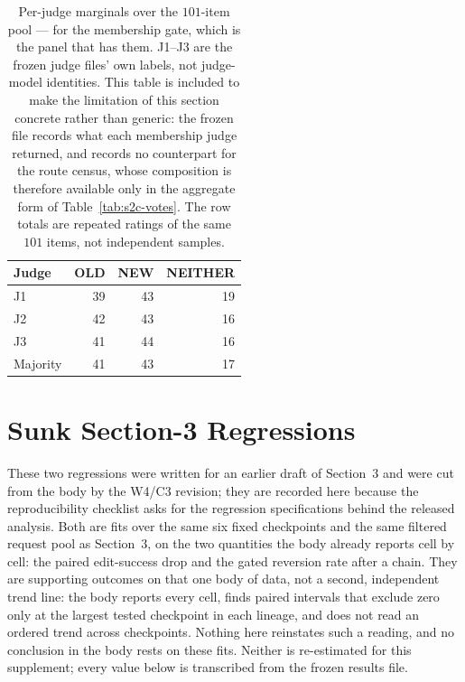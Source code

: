 \documentclass[letterpaper]{article}
\begin{document}
\begin{table}[t]
\centering
\small
\begin{tabular}{lrrr}
\toprule
Judge & OLD & NEW & NEITHER \\
\midrule
J1       & 39 & 43 & 19 \\
J2       & 42 & 43 & 16 \\
J3       & 41 & 44 & 16 \\
\midrule
Majority & 41 & 43 & 17 \\
\bottomrule
\end{tabular}
\caption{Per-judge marginals over the \(101\)-item pool --- for the membership
gate, which is the panel that has them.  J1--J3 are the frozen judge files' own
labels, not judge-model identities.  This table is included to make the
limitation of this section concrete rather than generic: the frozen file records
what each membership judge returned, and records no counterpart for the route
census, whose composition is therefore available only in the aggregate form of
Table~\ref{tab:s2c-votes}.  The row totals are repeated ratings of the same
\(101\) items, not independent samples.}
\label{tab:s2c-marginals}
\end{table}

\section{Sunk Section-3 Regressions}
These two regressions were written for an earlier draft of Section~3 and were
cut from the body by the W4/C3 revision; they are recorded here because the
reproducibility checklist asks for the regression specifications behind the
released analysis.  Both are fits over the same six fixed checkpoints and the
same filtered request pool as Section~3, on the two quantities the body already
reports cell by cell: the paired edit-success drop and the gated reversion rate
after a chain.  They are supporting outcomes on that one body of data, not a
second, independent trend line: the body reports every cell, finds paired
intervals that exclude zero only at the largest tested checkpoint in each
lineage, and does not read an ordered trend across checkpoints.  Nothing here
reinstates such a reading, and no conclusion in the body rests on these fits.
Neither is re-estimated for this supplement; every value below is transcribed
from the frozen results file.
\end{document}
